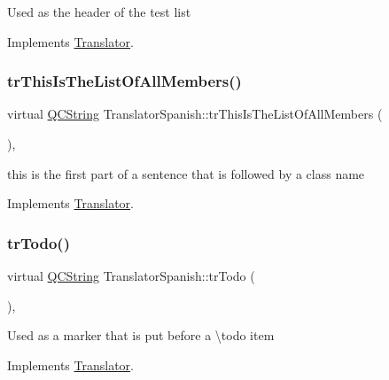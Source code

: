 Used as the header of the test list 

Implements \mbox{\hyperlink{class_translator}{Translator}}.

\mbox{\label{class_translator_spanish_a05251a6e5f309d8f3d0d640577718253}} 
\subsubsection{\texorpdfstring{trThisIsTheListOfAllMembers()}{trThisIsTheListOfAllMembers()}}
{\footnotesize\ttfamily virtual \mbox{\hyperlink{class_q_c_string}{Q\+C\+String}} Translator\+Spanish\+::tr\+This\+Is\+The\+List\+Of\+All\+Members (\begin{DoxyParamCaption}{ }\end{DoxyParamCaption})\hspace{0.3cm}{\ttfamily [inline]}, {\ttfamily [virtual]}}

this is the first part of a sentence that is followed by a class name 

Implements \mbox{\hyperlink{class_translator}{Translator}}.

\mbox{\label{class_translator_spanish_af4efe183b5c04557a1ca1dd6e38ad6af}} 
\subsubsection{\texorpdfstring{trTodo()}{trTodo()}}
{\footnotesize\ttfamily virtual \mbox{\hyperlink{class_q_c_string}{Q\+C\+String}} Translator\+Spanish\+::tr\+Todo (\begin{DoxyParamCaption}{ }\end{DoxyParamCaption})\hspace{0.3cm}{\ttfamily [inline]}, {\ttfamily [virtual]}}

Used as a marker that is put before a \textbackslash{}todo item 

Implements \mbox{\hyperlink{class_translator}{Translator}}.

\mbox{\label{class_translator_spanish_a6228a3cd135be2558bd639e356bfb745}} 
